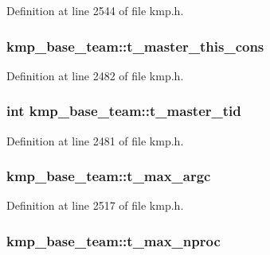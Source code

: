 Definition at line 2544 of file kmp.\-h.

\hypertarget{structkmp__base__team_a4105b3d4eccd8b895d1c608572def9b2}{
\subsubsection[{t\-\_\-master\-\_\-this\-\_\-cons}]{ kmp\-\_\-base\-\_\-team\-::t\-\_\-master\-\_\-this\-\_\-cons}}\label{structkmp__base__team_a4105b3d4eccd8b895d1c608572def9b2}


Definition at line 2482 of file kmp.\-h.

\hypertarget{structkmp__base__team_afca37baea16bb9bc5f42de830c501277}{
\subsubsection[{t\-\_\-master\-\_\-tid}]{ {\bf int} kmp\-\_\-base\-\_\-team\-::t\-\_\-master\-\_\-tid}}\label{structkmp__base__team_afca37baea16bb9bc5f42de830c501277}


Definition at line 2481 of file kmp.\-h.

\hypertarget{structkmp__base__team_a3b3f693b357e59beca228b4d5e516d47}{
\subsubsection[{t\-\_\-max\-\_\-argc}]{ kmp\-\_\-base\-\_\-team\-::t\-\_\-max\-\_\-argc}}\label{structkmp__base__team_a3b3f693b357e59beca228b4d5e516d47}


Definition at line 2517 of file kmp.\-h.

\hypertarget{structkmp__base__team_ac07cb8c925f1419c6dc953624443d5fe}{
\subsubsection[{t\-\_\-max\-\_\-nproc}]{ kmp\-\_\-base\-\_\-team\-::t\-\_\-max\-\_\-nproc}}\label{structkmp__base__team_ac07cb8c925f1419c6dc953624443d5fe}


